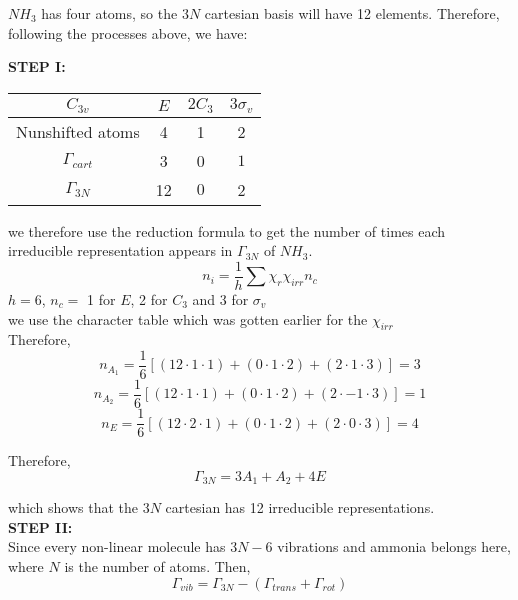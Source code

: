 \documentclass[a4paper, 12pt, openany]{report}
\begin{document}
 $NH_3$ has four atoms, so the $3N$ cartesian basis will have 12 elements. Therefore, following the processes above, we have:
 
 \textbf{STEP I:}\\
  \begin{table}[H]\centering\begin{tabular}{|c|c|c|c|}\hline
 		$C_{3v}$&$E$&$2C_3$&$3\sigma_v$\\\hline
 		Nunshifted atoms&4&1&2\\\hline
 		$\Gamma_{cart}$&3&0&$1$\\\hline
 		$\Gamma_{3N}$&12&$0$&2\\\hline
 \end{tabular}\end{table} 
 we therefore use the reduction formula to get the number of times each \linebreak irreducible representation appears in $\Gamma_{3N}$ of $NH_3$.
 	$$n_i=\frac{1}{h}\sum\chi_r\chi_{irr}n_c$$
 	 $h=6$, $n_c=$ 1 for $E$, 2 for $C_3$  and 3 for $\sigma_v$\\
 	 we use the character table which was gotten earlier for the $\chi_{irr}$ \\Therefore,
 $$n_{A_1}=\frac{1}{6}[(12\cdot1\cdot1)+(0\cdot1\cdot2)+(2\cdot1\cdot3)]=3$$
  $$n_{A_2}=\frac{1}{6}[(12\cdot1\cdot1)+(0\cdot1\cdot2)+(2\cdot-1\cdot3)]=1$$
  $$n_E=\frac{1}{6}[(12\cdot2\cdot1)+(0\cdot1\cdot2)+(2\cdot0\cdot3)]=4$$
 
 Therefore, $$\Gamma_{3N}=3A_1+A_2+4E$$
  
 which shows that the $3N$ cartesian has 12 irreducible representations.\\
 
 \textbf{STEP II:}\\
 Since every non-linear molecule has $3N-6$ vibrations and ammonia belongs here, where $N$ is the number of atoms.
Then, 
 \begin{equation}\label{d}\Gamma_{vib}=\Gamma_{3N}-(\Gamma_{trans}+\Gamma_{rot})\end{equation}
 
\end{document}
